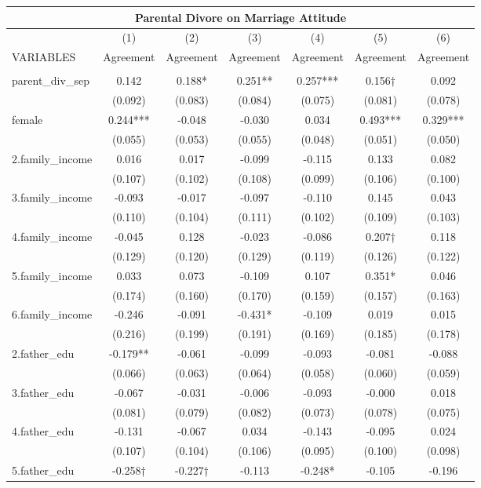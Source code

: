 \documentclass[]{article}
\begin{document}
\begin{tabular}{lcccccc}
\multicolumn{7}{c}{Parental Divore on Marriage Attitude} \\ \hline
 & (1) & (2) & (3) & (4) & (5) & (6) \\
VARIABLES & Agreement & Agreement & Agreement & Agreement & Agreement & Agreement \\ \hline
 &  &  &  &  &  &  \\
parent\_div\_sep & 0.142 & 0.188* & 0.251** & 0.257*** & 0.156† & 0.092 \\
 & (0.092) & (0.083) & (0.084) & (0.075) & (0.081) & (0.078) \\
female & 0.244*** & -0.048 & -0.030 & 0.034 & 0.493*** & 0.329*** \\
 & (0.055) & (0.053) & (0.055) & (0.048) & (0.051) & (0.050) \\
2.family\_income & 0.016 & 0.017 & -0.099 & -0.115 & 0.133 & 0.082 \\
 & (0.107) & (0.102) & (0.108) & (0.099) & (0.106) & (0.100) \\
3.family\_income & -0.093 & -0.017 & -0.097 & -0.110 & 0.145 & 0.043 \\
 & (0.110) & (0.104) & (0.111) & (0.102) & (0.109) & (0.103) \\
4.family\_income & -0.045 & 0.128 & -0.023 & -0.086 & 0.207† & 0.118 \\
 & (0.129) & (0.120) & (0.129) & (0.119) & (0.126) & (0.122) \\
5.family\_income & 0.033 & 0.073 & -0.109 & 0.107 & 0.351* & 0.046 \\
 & (0.174) & (0.160) & (0.170) & (0.159) & (0.157) & (0.163) \\
6.family\_income & -0.246 & -0.091 & -0.431* & -0.109 & 0.019 & 0.015 \\
 & (0.216) & (0.199) & (0.191) & (0.169) & (0.185) & (0.178) \\
2.father\_edu & -0.179** & -0.061 & -0.099 & -0.093 & -0.081 & -0.088 \\
 & (0.066) & (0.063) & (0.064) & (0.058) & (0.060) & (0.059) \\
3.father\_edu & -0.067 & -0.031 & -0.006 & -0.093 & -0.000 & 0.018 \\
 & (0.081) & (0.079) & (0.082) & (0.073) & (0.078) & (0.075) \\
4.father\_edu & -0.131 & -0.067 & 0.034 & -0.143 & -0.095 & 0.024 \\
 & (0.107) & (0.104) & (0.106) & (0.095) & (0.100) & (0.098) \\
5.father\_edu & -0.258† & -0.227† & -0.113 & -0.248* & -0.105 & -0.196 \\

\end{tabular}
\end{document}

